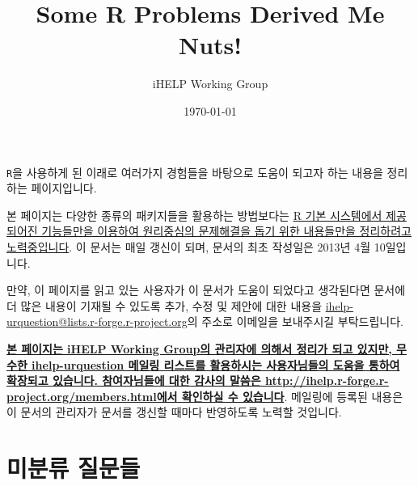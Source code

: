 \documentclass{article}
\title{Some R Problems Derived Me Nuts!}
\author{iHELP Working Group}
\date{\today}
\begin{document}
\maketitle

\texttt{R}을 사용하게 된 이래로 여러가지 경험들을 바탕으로 도움이 되고자 하는 내용을 정리하는 페이지입니다.

본 페이지는 다양한 종류의 패키지들을 활용하는 방법보다는 \underline{R 기본 시스템에서 제공되어진 기능들만을 이용하여 원리중심의 문제해결을 돕기 위한 내용들만을 정리하려고 노력중입니다}. 
이 문서는 매일 갱신이 되며, 문서의 최초 작성일은 2013년 4월 10일입니다.

만약, 이 페이지를 읽고 있는 사용자가 이 문서가 도움이 되었다고 생각된다면 문서에 더 많은 내용이 기재될 수 있도록 추가, 수정 및 제안에 대한 내용을 \href{mailto:ihelp-urquestion@lists.r-forge.r-project.org}{ihelp-urquestion@lists.r-forge.r-project.org}의 주소로 이메일을 보내주시길 부탁드립니다. 

\textbf{\underline{본 페이지는 iHELP Working Group의 관리자에 의해서 정리가 되고 있지만, 무수한 ihelp-urquestion 메일링 리스트를 활용하시는 사용자님들의 도움을 통하여 확장되고 있습니다.
참여자님들에 대한 감사의 말씀은 \url{http://ihelp.r-forge.r-project.org/members.html}에서 확인하실 수 있습니다}}.  
%
메일링에 등록된 내용은 이 문서의 관리자가 문서를 갱신할 때마다 반영하도록 노력할 것입니다.


%
%

\section{미분류 질문들}



\end{document}
